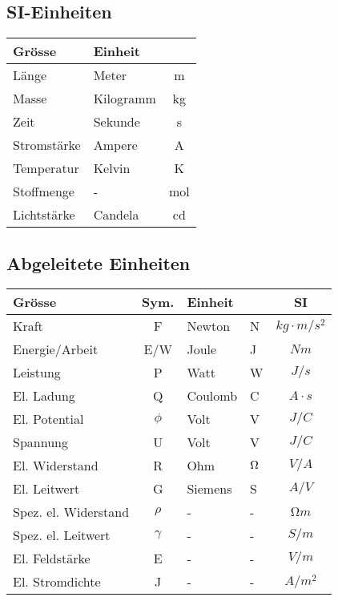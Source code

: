 \begin{sectionbox}
\begin{emphbox}
\begin{tabular}{ccll}
			\end{tabular}
		\end{emphbox}
	
	\subsection{SI-Einheiten}
		\begin{emphbox}
			\begin{tabular}{llc}
				Grösse & Einheit & \\
				\hline
				Länge & Meter & m \\
				Masse & Kilogramm & kg \\
				Zeit & Sekunde & s \\
				Stromstärke & Ampere & A \\
				Temperatur & Kelvin & K \\
				Stoffmenge & - & mol \\
				Lichtstärke & Candela & cd			
		\end{tabular}
	\end{emphbox}
	
	
	\subsection{Abgeleitete Einheiten}
		\begin{emphbox}
			\begin{tabular}{lcllc}
				Grösse & Sym. & Einheit &  & SI \\
				\hline
				Kraft & F & Newton & N & $kg\cdot m/s^2$ \\
				Energie/Arbeit & E/W & Joule & J & $Nm$ \\
				Leistung & P & Watt & W & $J/s$ \\
				El. Ladung & Q & Coulomb & C & $A \cdot s$ \\
				El. Potential & $\phi$ & Volt & V & $J/C$ \\
				Spannung & U & Volt & V & $J/C$ \\
				El. Widerstand & R & Ohm & $\ohm$ & $V/A$ \\
				El. Leitwert & G & Siemens & S & $A/V$ \\
				Spez. el. Widerstand & $\rho$ & - & - & $Ωm$ \\
				Spez. el. Leitwert & $\gamma$ & - & - & $S/m$ \\
				El. Feldstärke & E & - & - & $V/m$ \\
				El. Stromdichte & J & - & - & $A/m^2$ \\
			\end{tabular}
		\end{emphbox}
	
\end{sectionbox}

